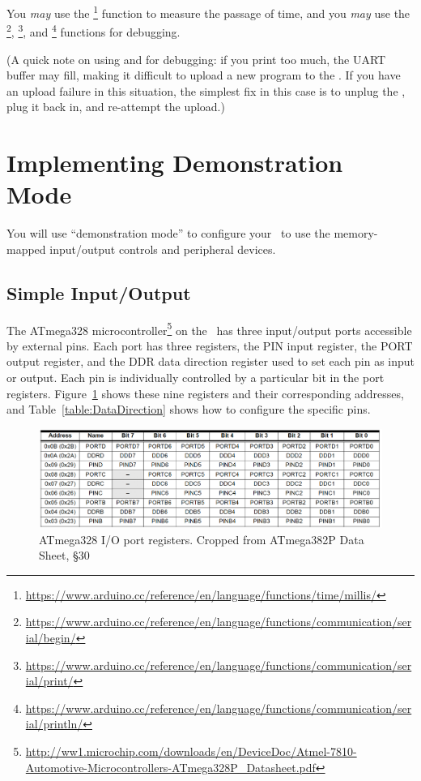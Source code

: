 You \textit{may} use the
\footnote{\url{https://www.arduino.cc/reference/en/language/functions/time/millis/}}
function to measure the passage of time, and you \textit{may} use the
\footnote{\url{https://www.arduino.cc/reference/en/language/functions/communication/serial/begin/}},
\footnote{\url{https://www.arduino.cc/reference/en/language/functions/communication/serial/print/}}, and
\footnote{\url{https://www.arduino.cc/reference/en/language/functions/communication/serial/println/}} functions for debugging.

(A quick note on using  and  for
debugging: if you print too much, the UART buffer may fill, making it
difficult to upload a new program to the \nano. If you have an upload
failure in this situation, the simplest fix in this case is to unplug the
\nano, plug it back in, and re-attempt the upload.)

\section{Implementing Demonstration Mode} \label{sec:DemonstrationMode}

You will use ``demonstration mode'' to configure your \nano\ to use the
memory-mapped input/output controls and peripheral devices.

\subsection{Simple Input/Output}

The ATmega328 microcontroller\footnote{\url{http://ww1.microchip.com/downloads/en/DeviceDoc/Atmel-7810-Automotive-Microcontrollers-ATmega328P_Datasheet.pdf}}
on the \nano\ has three input/output ports accessible by external pins. Each
port has three registers, the PIN input register, the PORT output register, and
the DDR data direction register used to set each pin as input or output. Each
pin is individually controlled by a particular bit in the port registers.
Figure~\ref{fig:IoPortRegisters} shows these nine registers and their
corresponding addresses, and Table~\ref{table:DataDirection} shows how to
configure the specific pins.

\begin{figure}
    \centering
    \includegraphics[width=15cm]{IoPortRegisters}
    \caption{ATmega328 I/O port registers. \tiny Cropped from ATmega382P Data Sheet, §30 \label{fig:IoPortRegisters}}
\end{figure}

